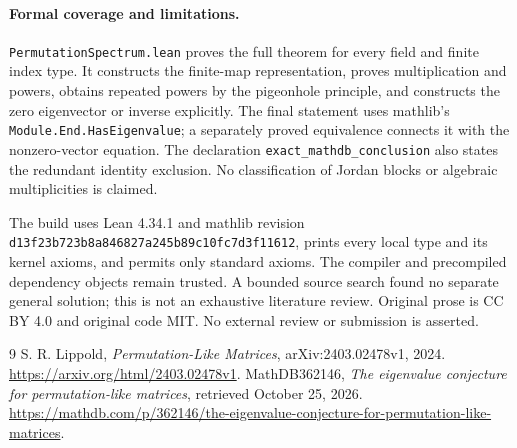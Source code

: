 \documentclass[11pt]{article}
\begin{document}
\paragraph{Formal coverage and limitations.}
\texttt{PermutationSpectrum.lean} proves the full theorem for every field and
finite index type. It constructs the finite-map representation, proves
multiplication and powers, obtains repeated powers by the pigeonhole principle,
and constructs the zero eigenvector or inverse explicitly. The final statement
uses mathlib's \texttt{Module.End.HasEigenvalue}; a separately proved equivalence
connects it with the nonzero-vector equation. The declaration
\texttt{exact\_mathdb\_conclusion} also states the redundant identity exclusion.
No classification of Jordan blocks or algebraic multiplicities is claimed.

The build uses Lean 4.34.1 and mathlib revision
\texttt{d13f23b723b8a846827a245b89c10fc7d3f11612}, prints every local type and
its kernel axioms, and permits only standard axioms. The compiler and
precompiled dependency objects remain trusted. A bounded source search found
no separate general solution; this is not an exhaustive literature review.
Original prose is CC BY 4.0 and original code MIT. No external review or
submission is asserted.
\begin{thebibliography}{9}
 S. R. Lippold, \emph{Permutation-Like Matrices},
arXiv:2403.02478v1, 2024.
\url{https://arxiv.org/html/2403.02478v1}.
 MathDB362146, \emph{The eigenvalue conjecture for
permutation-like matrices}, retrieved October 25, 2026.
\url{https://mathdb.com/p/362146/the-eigenvalue-conjecture-for-permutation-like-matrices}.
\end{thebibliography}
\end{document}
